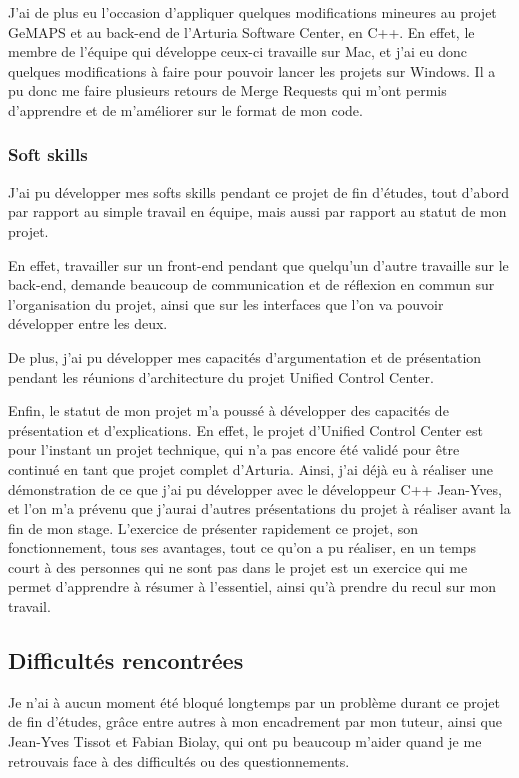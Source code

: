 \documentclass[francais]{rapportPFE}  %
\begin{document}
J'ai de plus eu l'occasion d'appliquer quelques modifications mineures au projet GeMAPS et au back-end de l'Arturia Software Center, en C++. En effet, le membre de l'équipe qui développe ceux-ci travaille sur Mac, et j'ai eu donc quelques modifications à faire pour pouvoir lancer les projets sur Windows. Il a pu donc me faire plusieurs retours de Merge Requests qui m'ont permis d'apprendre et de m'améliorer sur le format de mon code.






\subsubsection{Soft skills}

J'ai pu développer mes softs skills pendant ce projet de fin d'études, tout d'abord par rapport au simple travail en équipe, mais aussi par rapport au statut de mon projet.

En effet, travailler sur un front-end pendant que quelqu'un d'autre travaille sur le back-end, demande beaucoup de communication et de réflexion en commun sur l'organisation du projet, ainsi que sur les interfaces que l'on va pouvoir développer entre les deux.

De plus, j'ai pu développer mes capacités d'argumentation et de présentation pendant les réunions d'architecture du projet Unified Control Center. 

Enfin, le statut de mon projet m'a poussé à développer des capacités de présentation et d'explications. En effet, le projet d'Unified Control Center est pour l'instant un projet technique, qui n'a pas encore été validé pour être continué en tant que projet complet d'Arturia. Ainsi, j'ai déjà eu à réaliser une démonstration de ce que j'ai pu développer avec le développeur C++ Jean-Yves, et l'on m'a prévenu que j'aurai d'autres présentations du projet à réaliser avant la fin de mon stage. L'exercice de présenter rapidement ce projet, son fonctionnement, tous ses avantages, tout ce qu'on a pu réaliser, en un temps court à des personnes qui ne sont pas dans le projet est un exercice qui me permet d'apprendre à résumer à l'essentiel, ainsi qu'à prendre du recul sur mon travail.

\subsection{Difficultés rencontrées}
Je n'ai à aucun moment été bloqué longtemps par un problème durant ce projet de fin d'études, grâce entre autres à mon encadrement par mon tuteur, ainsi que Jean-Yves Tissot et Fabian Biolay, qui ont pu beaucoup m'aider quand je me retrouvais face à des difficultés ou des questionnements. 
\end{document}
